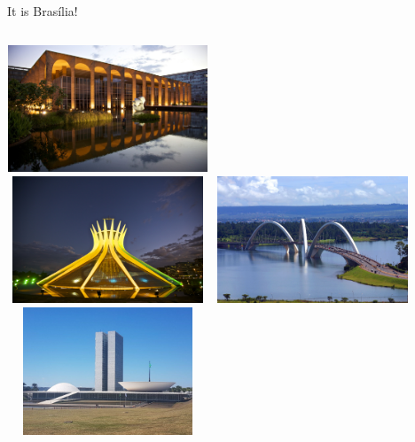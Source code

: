 \documentclass[newPxFont,numfooter,sectionpages]{beamer}
\begin{document}

\begin{frame}{It is Brasília!}

\begin{columns}[t]
\centering
\includegraphics[width=6cm,height=3.8cm]{images/itamaraty-palace-braslia.jpg}\\
\includegraphics[width=6cm,height=3.8cm]{images/brasilia1.jpg}
\centering
\includegraphics[width=6cm,height=3.8cm]{images/bridge-bsb.jpg}\\
\includegraphics[width=6cm,height=3.8cm]{images/praca-poderes.jpg}
\end{columns}
    
\end{frame}
\end{document}
